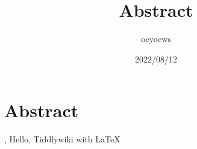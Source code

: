 \documentclass[UTF8]{article}
\title{Abstract \emoji{rocket}}
\author{oeyoews}
\date{2022/08/12}
\begin{document}
\maketitle

\section{Abstract }%
\label{sec:emoji}

, Hello, Tiddlywiki with \LaTeX{}
\end{document}
